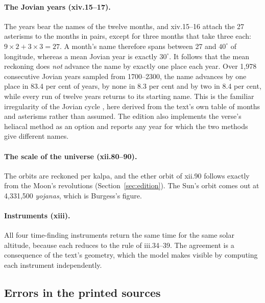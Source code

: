 \documentclass[11pt,a4paper]{article}
\begin{document}
\paragraph{The Jovian years (xiv.15--17).} The years bear the names of the twelve months, and xiv.15--16 attach the 27 asterisms to the months in pairs, except for three months that take three each: $9\times2+3\times3=27$. A month's name therefore spans between 27 and $40^\circ$ of longitude, whereas a mean Jovian year is exactly $30^\circ$. It follows that the mean reckoning does \emph{not} advance the name by exactly one place each year. Over 1,978 consecutive Jovian years sampled from 1700--2300, the name advances by one place in 83.4 per cent of years, by none in 8.3 per cent and by two in 8.4 per cent, while every run of twelve years returns to its starting name. This is the familiar irregularity of the Jovian cycle \citep{sewell1896}, here derived from the text's own table of months and asterisms rather than assumed. The edition also implements the verse's heliacal method as an option and reports any year for which the two methods give different names.

\paragraph{The scale of the universe (xii.80--90).} The orbits are reckoned per kalpa, and the ether orbit of xii.90 follows exactly from the Moon's revolutions (Section~\ref{sec:edition}). The Sun's orbit comes out at 4,331,500 \textit{yojanas}, which is Burgess's figure.

\paragraph{Instruments (xiii).} All four time-finding instruments return the same time for the same solar altitude, because each reduces to the rule of iii.34--39. The agreement is a consequence of the text's geometry, which the model makes visible by computing each instrument independently.

\subsection{Errors in the printed sources}
\label{sec:book-errors}
\end{document}
